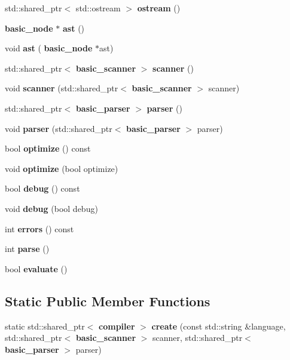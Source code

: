 \begin{DoxyCompactItemize}
\mbox{\label{classcdk_1_1compiler_a36a108cb45b06e37eca6dfc4075784fa}} 
std\+::shared\+\_\+ptr$<$ std\+::ostream $>$ {\bfseries ostream} ()
\item 
\mbox{\label{classcdk_1_1compiler_ae95606d4deb9e5be056685b1f634d10f}} 
\textbf{ basic\+\_\+node} $\ast$ {\bfseries ast} ()
\item 
\mbox{\label{classcdk_1_1compiler_a841837c96b96d9c59532e57982011dc0}} 
void {\bfseries ast} (\textbf{ basic\+\_\+node} $\ast$ast)
\item 
\mbox{\label{classcdk_1_1compiler_abc44fb2cd388b0c4f76e0797e0972ecf}} 
std\+::shared\+\_\+ptr$<$ \textbf{ basic\+\_\+scanner} $>$ {\bfseries scanner} ()
\item 
\mbox{\label{classcdk_1_1compiler_a4ee8a64e131f0fd1d179e8be8d88e654}} 
void {\bfseries scanner} (std\+::shared\+\_\+ptr$<$ \textbf{ basic\+\_\+scanner} $>$ scanner)
\item 
\mbox{\label{classcdk_1_1compiler_a701f3411ada26d678b133134f492e6dd}} 
std\+::shared\+\_\+ptr$<$ \textbf{ basic\+\_\+parser} $>$ {\bfseries parser} ()
\item 
\mbox{\label{classcdk_1_1compiler_a52a6e6b5cfa7361ceb0372ef6b4a9f73}} 
void {\bfseries parser} (std\+::shared\+\_\+ptr$<$ \textbf{ basic\+\_\+parser} $>$ parser)
\item 
\mbox{\label{classcdk_1_1compiler_a23a67b0daf438a0ac90413825341ff6b}} 
bool {\bfseries optimize} () const
\item 
\mbox{\label{classcdk_1_1compiler_afd34aede83f1a60e8f2685b7a9e31ffe}} 
void {\bfseries optimize} (bool optimize)
\item 
\mbox{\label{classcdk_1_1compiler_ac7f77a847c841602342caf5b0e43c2a5}} 
bool {\bfseries debug} () const
\item 
\mbox{\label{classcdk_1_1compiler_a672a0cd7f68b61956fdbd541b21445a1}} 
void {\bfseries debug} (bool debug)
\item 
\mbox{\label{classcdk_1_1compiler_aa72626ba181a0ec880abb18def9804fd}} 
int {\bfseries errors} () const
\item 
\mbox{\label{classcdk_1_1compiler_a1f39738f2142ebdabfc2122b635fa9d7}} 
int {\bfseries parse} ()
\item 
bool \textbf{ evaluate} ()
\end{DoxyCompactItemize}
\subsection*{Static Public Member Functions}
\begin{DoxyCompactItemize}
\item 
\mbox{\label{classcdk_1_1compiler_a0e14073a550646ab3ffeb20ec2c31691}} 
static std\+::shared\+\_\+ptr$<$ \textbf{ compiler} $>$ {\bfseries create} (const std\+::string \&language, std\+::shared\+\_\+ptr$<$ \textbf{ basic\+\_\+scanner} $>$ scanner, std\+::shared\+\_\+ptr$<$ \textbf{ basic\+\_\+parser} $>$ parser)
\end{DoxyCompactItemize}
